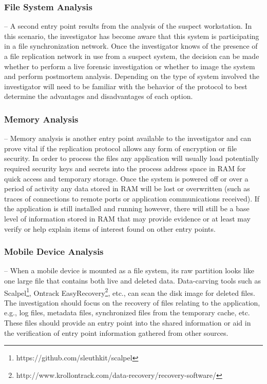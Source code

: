 \documentclass{jdfsl}
\begin{document}
\subsubsection{File System Analysis}
\label{LSDIS}
-- A second entry point results from the analysis of the suspect workstation. In this scenario, the investigator has become aware that this system is participating in a file synchronization network. Once the investigator knows of the presence of a file replication network in use from a suspect system, the decision can be made whether to perform a live forensic investigation or whether to image the system and perform postmortem analysis. Depending on the type of system involved the investigator will need to be familiar with the behavior of the protocol to best determine the advantages and disadvantages of each option. \\

\subsubsection{Memory Analysis}
\label{RAMDIS}
-- Memory analysis is another entry point available to the investigator and can prove vital if the replication protocol allows any form of encryption or file security. In order to process the files any application will usually load potentially required security keys and secrets into the process address space in RAM for quick access and temporary storage. Once the system is powered off or over a period of activity any data stored in RAM will be lost or overwritten (such as traces of connections to remote ports or application communications received). If the application is still installed and running however, there will still be a base level of information stored in RAM that may provide evidence or at least may verify or help explain items of interest found on other entry points. \\

\subsubsection{Mobile Device Analysis}
\label{mobileentry}
-- When a mobile device is mounted as a file system, its raw partition looks like one large file that contains both live and deleted data. Data-carving tools such as Scalpel\footnote{https://github.com/sleuthkit/scalpel}, Ontrack EasyRecovery\footnote{http://www.krollontrack.com/data-recovery/recovery-software/}, etc., can scan the disk image for deleted files. The investigation should focus on the recovery of files relating to the application, e.g., log files, metadata files, synchronized files from the temporary cache, etc. These files should provide an entry point into the shared information or aid in the verification of entry point information gathered from other sources.\\
\end{document}
